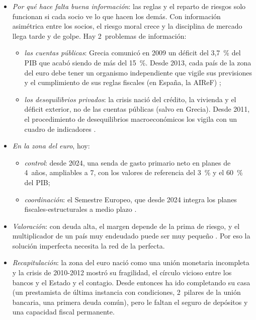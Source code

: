 \documentclass[11pt]{article}
\begin{document}
\begin{itemize}
\begin{itemize}
  \end{itemize}
\item \emph{Por qué hace falta buena información}: las reglas y el reparto de riesgos solo funcionan si cada socio ve lo que hacen los demás. Con información asimétrica entre los socios, el riesgo moral crece y la disciplina de mercado llega tarde y de golpe. Hay 2~problemas de información:
  \begin{itemize}
  \item \emph{las cuentas públicas}: Grecia comunicó en 2009 un déficit del 3,7~\% del PIB que acabó siendo de más del 15~\%\nocite{Eurostat2010Grecia}. Desde 2013, cada país de la zona del euro debe tener un organismo independiente que vigile sus previsiones y el cumplimiento de sus reglas fiscales (en España, la AIReF)\nocite{UE2013Reglamento473} ;
  \item \emph{los desequilibrios privados}: la crisis nació del crédito, la vivienda y el déficit exterior, no de las cuentas públicas (salvo en Grecia). Desde 2011, el procedimiento de desequilibrios macroeconómicos los vigila con un cuadro de indicadores\nocite{UE2011Reglamento1176} .
  \end{itemize}
\item \emph{En la zona del euro}, hoy:
  \begin{itemize}
  \item \emph{control}: desde 2024, una senda de gasto primario neto en planes de 4~años, ampliables a 7, con los valores de referencia del 3~\% y el 60~\% del PIB\nocite{UE2024Reglamento1263,UE2024Reglamento1264};
  \item \emph{coordinación}: el Semestre Europeo, que desde 2024 integra los planes fiscales-estructurales a medio plazo\nocite{UE2024Reglamento1263} .
  \end{itemize}
\item \emph{Valoración}: con deuda alta, el margen depende de la prima de riesgo, y el multiplicador de un país muy endeudado puede ser muy pequeño . Por eso la solución imperfecta necesita la red de la perfecta.
\end{itemize}

\begin{itemize}
\item \emph{Recapitulación}: la zona del euro nació como una unión monetaria incompleta y la crisis de 2010-2012 mostró su fragilidad, el círculo vicioso entre los bancos y el Estado y el contagio. Desde entonces ha ido completando su casa (un prestamista de última instancia con condiciones, 2~pilares de la unión bancaria, una primera deuda común), pero le faltan el seguro de depósitos y una capacidad fiscal permanente.
\end{itemize}
\end{document}

